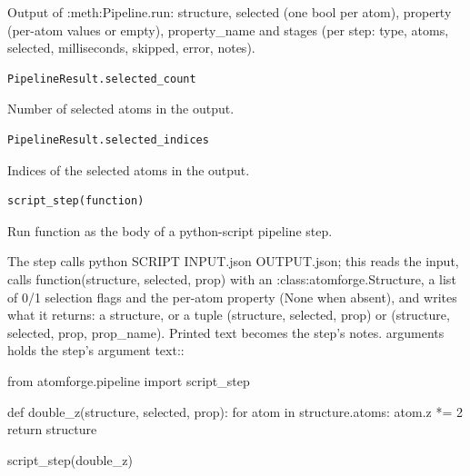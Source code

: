 Output of :meth:Pipeline.run: structure, selected (one bool per atom),
property (per-atom values or empty), property\_\allowbreak{}name and stages
(per step: type, atoms, selected, milliseconds, skipped, error, notes).

\begin{samepage}

\begin{lstlisting}[language=Python]
PipelineResult.selected_count
\end{lstlisting}

Number of selected atoms in the output.

\end{samepage}



\begin{samepage}

\begin{lstlisting}[language=Python]
PipelineResult.selected_indices
\end{lstlisting}

Indices of the selected atoms in the output.

\end{samepage}



\begin{samepage}

\begin{lstlisting}[language=Python]
script_step(function)
\end{lstlisting}

Run function as the body of a python-script pipeline step.

The step calls python SCRIPT INPUT.json OUTPUT.json; this reads the
input, calls function(structure, selected, prop) with an
:class:atomforge.Structure, a list of 0/\allowbreak{}1 selection flags and the
per-atom property (None when absent), and writes what it returns: a
structure, or a tuple (structure, selected, prop) or
(structure, selected, prop, prop\_\allowbreak{}name). Printed text becomes the
step's notes. arguments holds the step's argument text::

    from atomforge.pipeline import script\_\allowbreak{}step

    def double\_\allowbreak{}z(structure, selected, prop):
        for atom in structure.atoms:
            atom.z *= 2
        return structure

    script\_\allowbreak{}step(double\_\allowbreak{}z)

\end{samepage}




